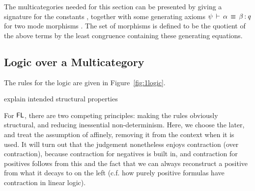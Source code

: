 The multicategories needed for this section can be presented by giving a
signature for the constants , together with some generating
axioms $\psi\,\vdash\,\mathit{\alpha} \, \equiv \, \mathit{\beta} \, \mathit{:} \, \mathit{q}$ for two mode morphisms
.  The set of morphisms is defined to be the
quotient of the above terms by the least congruence containing these
generating equations.

\subsection{Logic over a Multicategory}

The rules for the logic are given in Figure~\ref{fig:1logic}.  

explain intended structural properties

For $\mathsf{FL}$, there are two competing principles: making the rules
obviously structural, and reducing inessential non-determinism.  Here,
we choose the later, and treat the assumption of \F{\alpha}{\Delta}
affinely, removing it from the context when it is used.  It will turn
out that the judgement nonetheless enjoys contraction (over
contraction), because contraction for negatives is built in, and
contraction for positives follows from this and the fact that we can
always reconstruct a positive from what it decays to on the left
(c.f. how purely positive formulas have contraction in linear logic).  

